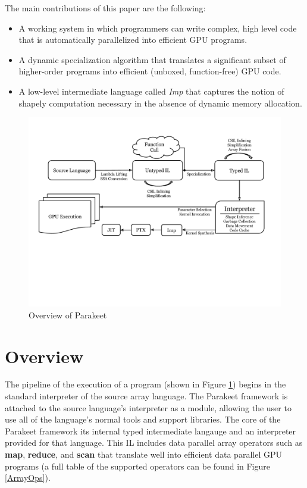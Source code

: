 \documentclass[preprint]{sigplanconf}
\begin{document}
The main contributions of this paper are the following:

\begin{itemize}
\item A working system in which programmers can write complex, high level code
that is automatically parallelized into efficient GPU programs.
\item A dynamic specialization algorithm that translates a significant subset of
higher-order programs into efficient (unboxed, function-free) GPU code.
\item A low-level intermediate language called \textit{Imp} that captures the
notion of shapely computation \cite{Jay97} necessary in the absence of dynamic
memory allocation.
\end{itemize}

\begin{figure}[t!bh]
\begin{center}
\leavevmode
\includegraphics[scale=0.6, trim=10pt 180pt 10pt 120pt]{Pipeline.pdf}
\end{center}
\caption{Overview of Parakeet}
\label{fig:overview}
\end{figure}
\section{Overview}


The pipeline of the execution of a program (shown in Figure
\ref{fig:overview}) begins in the standard interpreter of the source array
language.  The Parakeet framework is attached to the source language's
interpreter as a module, allowing the user to use all of the language's normal
tools and support libraries.  The core of the Parakeet framework its internal
typed intermediate langauge and an interpreter provided for that language. This
IL includes data parallel array operators such as \textbf{map},
\textbf{reduce}, and \textbf{scan} that translate well into efficient data
parallel GPU programs (a full table of the supported operators
can be found in Figure \ref{ArrayOps}).
\end{document}

